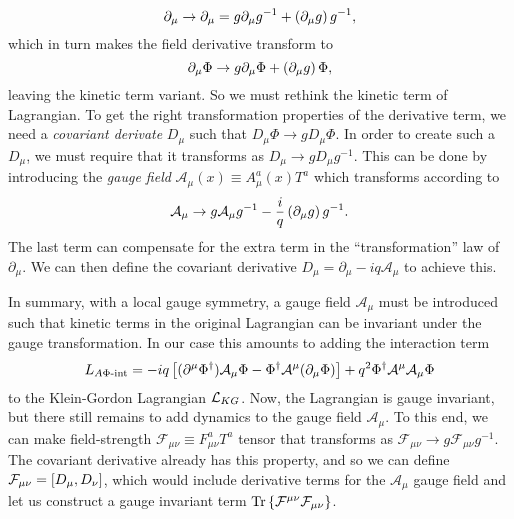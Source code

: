 \documentclass[../main.tex]{subfiles}
\begin{document}
\begin{equation}
    \partial_\mu \to \partial_\mu = g \partial_\mu g^{-1} +
    \left(\partial_\mu g\right) g^{-1},
\end{equation}
which in turn makes the field derivative transform to
\begin{equation}
    \partial_\mu \Phi \to g \partial_\mu \Phi + \left(\partial_\mu g\right) \Phi,
\end{equation}
leaving the kinetic term variant.
So we must rethink the kinetic term of Lagrangian.
To get the right transformation properties of the derivative term, we need a
\textit{covariant derivate } \(D_\mu\) such that \(D_\mu \Phi \to g D_\mu
\Phi\).
In order to create such a \(D_\mu\), we must require that it transforms as
\(D_\mu \to g D_\mu g^{-1}\).
This can be done by introducing the \textit{gauge field} \(\mathcal{A}_\mu(x)
\equiv A_\mu^a(x) T^a\) which transforms according to
\begin{equation}
    \mathcal{A}_\mu \to g \mathcal{A}_\mu g^{-1} - \frac{i}{q}
    \left(\partial_\mu g\right) g^{-1}.
\end{equation}
The last term can compensate for the extra term in the ``transformation'' law
of \(\partial_\mu\).
We can then define the covariant derivative \(D_\mu = \partial_\mu - iq
\mathcal{A}_\mu\) to achieve this.
\medskip

In summary, with a local gauge symmetry, a gauge field \(\mathcal{A}_\mu\) must
be introduced such that kinetic terms in the original Lagrangian can be
invariant under the gauge transformation. In our case this amounts to adding
the interaction term
\begin{equation}
    L_{A\Phi\text{-int}} = -iq\left[(\partial^\mu \Phi^\dagger)
        \mathcal{A}_\mu \Phi - \Phi^\dagger \mathcal{A}^\mu (\partial_\mu
        \Phi)\right] + q^2
    \Phi^\dagger \mathcal{A}^\mu \mathcal{A}_\mu \Phi
\end{equation}
to the Klein-Gordon Lagrangian \(\mathcal{L}_{KG}\).
Now, the Lagrangian is gauge invariant, but there still remains to add dynamics
to the gauge field \(\mathcal{A}_\mu\).
To this end, we can make field-strength \(\mathcal{F}_{\mu\nu} \equiv
F_{\mu\nu}^a T^a\) tensor that transforms as \(\mathcal{F}_{\mu\nu} \to g
\mathcal{F}_{\mu\nu} g^{-1}\).
The covariant derivative already has this property, and so we can define
\(\mathcal{F}_{\mu\nu} = \left[D_\mu,D_\nu\right]\), which would include
derivative terms for the \(\mathcal{A}_\mu\) gauge field and let us construct a
gauge invariant term \(\operatorname{Tr}\left\{\mathcal{F}^{\mu\nu}
    \mathcal{F}_{\mu\nu}\right\}\).
\end{document}
